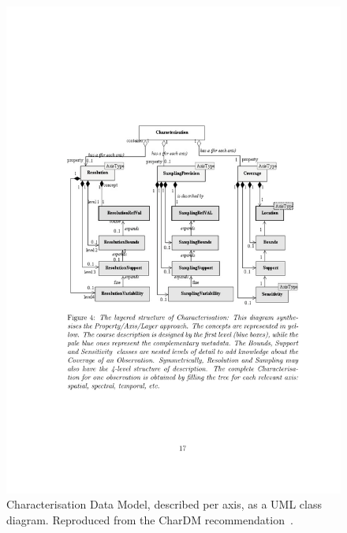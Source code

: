 			\begin{figure}[tbp]
				\centering
					\includegraphics[width=\columnwidth]
					{fig/CharDMPerAxisProperties.pdf}
				\caption[Characterisation Data Model per axis]
				{
					Characterisation Data Model, described per axis,
					as a UML class diagram.
					Reproduced from the CharDM
					recommendation~\cite{2008dmadcrept.....L}.
				}
				\label{fig:fig_CharDMPerAxisProperties}
			\end{figure}
		
